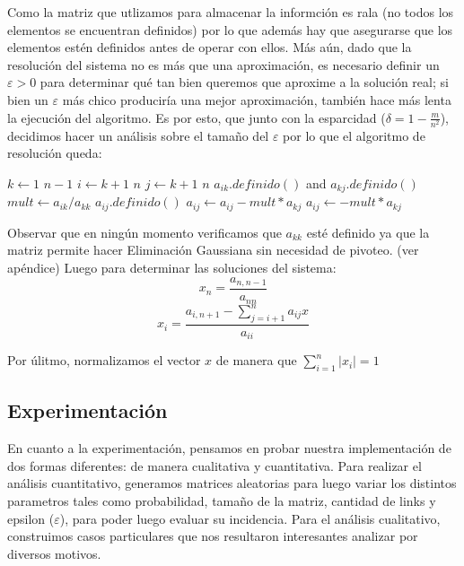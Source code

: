 \par Como la matriz que utlizamos para almacenar la informci\'on es rala (no todos los elementos se encuentran definidos) por lo que 
adem\'as hay que asegurarse que los elementos est\'en definidos antes de operar con ellos. M\'as a\'un, dado que la resoluci\'on
del sistema no es m\'as que una aproximaci\'on, es necesario definir un $\varepsilon > 0$ para determinar qu\'e tan bien queremos que 
aproxime a la soluci\'on real; si bien un $\varepsilon$ m\'as chico producir\'ia una mejor aproximaci\'on, tambi\'en hace m\'as lenta la
ejecuci\'on del algoritmo. Es por esto, que junto con la esparcidad ($\delta = 1 - \frac{m}{n^2}$), decidimos hacer un an\'alisis
sobre el tamaño del $\varepsilon$ por lo que el algoritmo de resoluci\'on queda:

\begin{codebox}\label{elimGaussRala}
\li \For $k \gets 1$ \To $n-1$
    \Do
\li     \For $i \gets k+1$ \To $n$
            \Do
\li         \For $j \gets k+1$ \To $n$
                \Do
\li                \If $a_{ik}.definido()$ and $a_{kj}.definido()$
                        \Then
\li                        $mult \gets a_{ik}/a_{kk}$
\li                     \If $a_{ij}.definido()$
                            \Then
\li                          $a_{ij} \gets a_{ij} - mult*a_{kj}$
\li                     \Else
\li                          $a_{ij} \gets - mult*a_{kj}$
                \End
            \End
        \End
\end{codebox}
Observar que en ning\'un momento verificamos que $a_{kk}$ est\'e definido ya que la matriz permite hacer Eliminación Gaussiana sin necesidad
de pivoteo. (ver ap\'endice)
Luego para determinar las soluciones del sistema\cite{burden}:
\[
    x_n = \frac{a_{n,n-1}}{a_{nn}}
    \]
    \[
    x_i = \frac {a_{i,n+1} - \sum_{j=i+1}^{n} a_{ij}x} {a_{ii}}
    \]

Por \'ulitmo, normalizamos el vector $x$ de manera que $\sum^{n}_{i=1} |x_i| = 1$
\subsection*{Experimentaci\'on}

\par
En cuanto a la experimentaci\'on, pensamos en probar nuestra implementaci\'on de dos formas diferentes: de manera cualitativa y cuantitativa.
Para realizar el an\'alisis cuantitativo, generamos matrices aleatorias para luego variar los distintos parametros tales como probabilidad, 
tamaño de la matriz, cantidad de links y epsilon ($\varepsilon$), para poder luego evaluar su incidencia. Para el an\'alisis cualitativo, construimos casos particulares
que nos resultaron interesantes analizar por diversos motivos.

